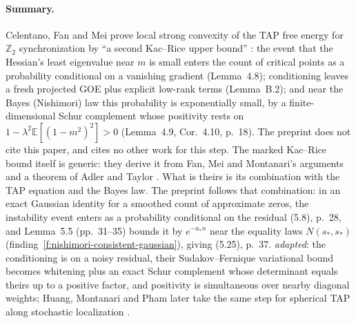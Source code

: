 \documentclass[11pt]{article}
\newcommand{\E}{\mathbb{E}}
\newcommand{\ploc}[2]{#1}
\newcommand{\sloc}[2]{\cite[#2]{#1}}
\newcommand{\rel}[1]{\textit{#1}}
\newcounter{finding}
\begin{document}
\paragraph{Summary.}
Celentano, Fan and Mei prove local strong convexity of the TAP free energy
for $\mathbb Z_2$ synchronization by ``a second Kac--Rice upper bound''
\sloc{CelentanoFanMei2021-LocalConvexityTAPZ2Sync}{\S4.1, p.~14}: the event
that the Hessian's least eigenvalue near $m$ is small enters the count of
critical points as a probability conditional on a vanishing gradient
(Lemma~4.8); conditioning leaves a fresh projected GOE plus explicit
low-rank terms (Lemma~B.2); and near the Bayes (Nishimori) law this
probability is exponentially small, by a finite-dimensional Schur complement
whose positivity rests on $1-\lambda^2\E[(1-m^2)^2]>0$ (Lemma~4.9,
Cor.~4.10, p.~18). The preprint does not cite this paper, and cites no
other work for this step. The marked Kac--Rice bound itself is generic: they
derive it from Fan, Mei and Montanari's arguments and a theorem of Adler and
Taylor \sloc{CelentanoFanMei2021-LocalConvexityTAPZ2Sync}{App.~A.5,
pp.~33--34}. What is theirs is its combination with the TAP equation and the
Bayes law. The preprint follows that combination: in an exact Gaussian
identity for a smoothed count of approximate zeros, the instability event
enters as a probability conditional on the residual
\ploc{(5.8), p.~28}{stability.tex:157--203}, and
\ploc{Lemma~5.5 (pp.~31--35)}{stability.tex:393--700} bounds it by
$e^{-a_*n}$ near the equality laws $N(s_*,s_*)$
(finding~\ref{f:nishimori-consistent-gaussian}), giving
\ploc{(5.25), p.~37}{stability.tex:864--906}. \rel{adapted}: the
conditioning is on a noisy residual, their Sudakov--Fernique variational
bound becomes whitening plus an exact Schur complement whose determinant
equals theirs up to a positive factor, and positivity is simultaneous over
nearby diagonal weights; Huang, Montanari and Pham later take the same step
for spherical TAP along stochastic localization
\sloc{HuangMontanariPham2024-SphericalSpinGlassSamplingSL}{Lemma~6.8,
Prop.~6.9, pp.~30--31}.
\end{document}
